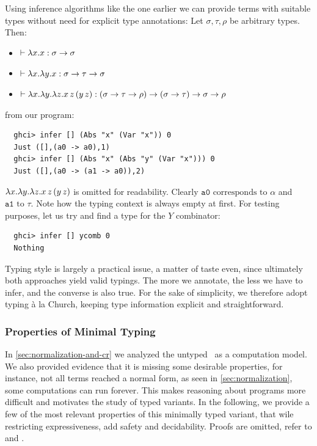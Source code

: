 \begin{example} Using inference algorithms like the one earlier we can provide terms with suitable types without need for explicit type annotations:
  Let $\sigma, \tau, \rho$ be arbitrary types. Then:
  \begin{itemize}
  \item $\vdash \lambda x . x : \sigma \to \sigma$
  \item $\vdash \lambda x . \lambda y . x : \sigma \to \tau \to \sigma$
  \item $\vdash \lambda x . \lambda y . \lambda z . x \, z \, (y \, z) 
    : (\sigma \to \tau \to \rho) \to (\sigma \to \tau) \to \sigma \to \rho$
  \end{itemize}
  from our program:
  \begin{verbatim}
  ghci> infer [] (Abs "x" (Var "x")) 0
  Just ([],(a0 -> a0),1)
  ghci> infer [] (Abs "x" (Abs "y" (Var "x"))) 0
  Just ([],(a0 -> (a1 -> a0)),2)
\end{verbatim}
$\lambda x . \lambda y . \lambda z . x \, z \, (y \, z)$ is omitted for readability. Clearly $\texttt{a0} \text{ corresponds to } \alpha$ and $\texttt{a1} \text{ to } \tau$. Note how the typing context is always empty at first. For testing purposes, let us try and find a type for the $Y$ combinator:
\begin{verbatim}
  ghci> infer [] ycomb 0
  Nothing
\end{verbatim}

\end{example}

\begin{note}
  Typing style is largely a practical issue, a matter of taste even, since ultimately both approaches yield valid typings. The more we annotate, the less we have to infer, and the converse is also true. For the sake of simplicity, we therefore adopt typing à la Church, keeping type information explicit and straightforward.
\end{note}

\subsubsection{\centering Properties of Minimal Typing}
In \ref{sec:normalization-and-cr} we analyzed the untyped \lcalc \ as a computation model. We also provided evidence that it is missing some desirable properties, for instance, not all terms reached a normal form, as seen in \ref{sec:normalization}, some computations can run forever. This makes reasoning about programs more difficult and motivates the study of typed variants. In the following, we provide a few of the most relevant properties of this minimally typed variant, that wile restricting expressiveness, add safety and decidability. Proofs are omitted, refer to \cite{nederpelt2014:type-theory} and \cite{Barendregt1992}.

